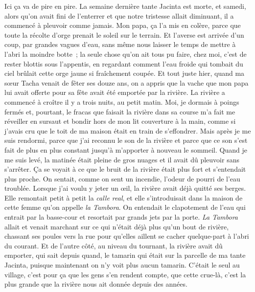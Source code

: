 	Ici ça va de pire en pire. La semaine dernière tante Jacinta est morte, et samedi, alors qu’on avait fini de l’enterrer et que notre tristesse allait diminuant, il a commencé à pleuvoir comme jamais. Mon papa, ça l’a mis en colère, parce que toute la récolte d’orge prenait le soleil sur le terrain. Et l’averse est arrivée d’un coup, par grandes vagues d’eau, sans même nous laisser le temps de mettre à l’abri la moindre botte ; la seule chose qu'on ait tous pu faire, chez moi, c’est de rester blottis sous l’appentis, en regardant comment l’eau froide qui tombait du ciel brûlait cette orge jaune si fraîchement coupée.
\pend
%
\pstart
	Et tout juste hier, quand ma sœur Tacha venait de fêter ses douze ans, on a appris que la vache que mon papa lui avait offerte pour sa fête avait été emportée par la rivière.
\pend
%
\pstart
	La rivière a commencé à croître il y a trois nuits, au petit matin. Moi, je dormais à poings fermés et, pourtant, le fracas que faisait la rivière dans sa course m’a fait me réveiller en sursaut et bondir hors de mon lit couverture à la main, comme si j’avais cru que le toit de ma maison était en train de s’effondrer. Mais après je me suis rendormi, parce que j’ai reconnu le son de la rivière et parce que ce son s’est fait de plus en plus constant jusqu’à m’apporter à nouveau le sommeil.
\pend
%
\pstart
	Quand je me suis levé, la matinée était pleine de gros nuages et il avait dû pleuvoir sans s’arrêter. Ça se voyait à ce que le bruit de la rivière était plus fort et s’entendait plus proche. On sentait, comme on sent un incendie, l’odeur de pourri de l’eau troublée.
\pend
%
\pstart
	Lorsque j’ai voulu y jeter un œil, la rivière avait déjà quitté ses berges. Elle remontait petit à petit la \textit{calle real}, et elle s’introduisait dans la maison de cette femme qu’on appelle \textit{la Tambora}. On entendait le clapotement de l’eau qui entrait par la basse-cour et resortait par grands jets par la porte. \textit{La Tambora} allait et venait marchant sur ce qui n’était déjà plus qu’un bout de rivière, chassant ses poules vers la rue pour qu’elles aillent se cacher quelque-part à l’abri du courant.
\pend
%
\pstart
	Et de l’autre côté, au niveau du tournant, la rivière avait dû emporter, qui sait depuis quand, le tamarin qui était sur la parcelle de ma tante Jacinta, puisque maintenant on n’y voit plus aucun tamarin. C’était le seul au village, c’est pour ça que les gens s’en rendent compte, que cette crue-là, c’est la plus grande que la rivière nous ait donnée depuis des années.
